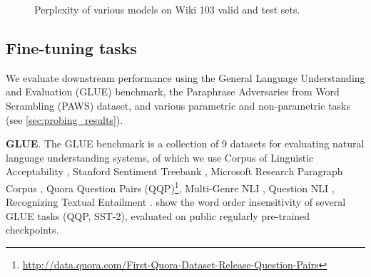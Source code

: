 \documentclass[letterpaper, 12pt]{report}
\newcommand{\xhdr}[1]{{\noindent\bfseries #1}.}
\begin{document}
\begin{figure}[t]
    \centering
    \caption{Perplexity of various models on Wiki 103 valid and test sets.}
    \label{fig:mlm_perplexity}
\end{figure}


\subsection{Fine-tuning tasks}

We evaluate downstream performance using the General Language Understanding and Evaluation (GLUE) benchmark, the Paraphrase Adversaries from Word Scrambling (PAWS) dataset, and various parametric and non-parametric tasks (see \autoref{sec:probing_results}).

\xhdr{GLUE} %
The GLUE \cite{wang-etal-2018-glue} benchmark is a collection of 9 datasets for evaluating natural language understanding systems, of which we use Corpus of Linguistic Acceptability \cite[CoLA,][]{cola_warstadt2019neural}, Stanford Sentiment Treebank \cite[SST,][]{sst2_socher2013recursive}, Microsoft Research Paragraph Corpus \cite[MRPC,][]{mrpc_dolan2005automatically}, Quora Question Pairs (QQP)\footnote{\href{http://data.quora.com/First-Quora-Dataset-Release-Question-Pairs}{http://data.quora.com/First-Quora-Dataset-Release-Question-Pairs}}, Multi-Genre NLI \cite[MNLI,][]{williams-etal-2018-broad}, Question NLI \cite[QNLI,][]{rajpurkar-etal-2016-squad, qnli_2_demszky2018transforming}, Recognizing Textual Entailment \cite[RTE,][]{rte1_dagan2005pascal, rte2_haim2006second, rte3_giampiccolo2007third, rte5_bentivogli2009fifth}.
\citet{pham2020} show the word order insensitivity of several GLUE tasks (QQP, SST-2), evaluated on public regularly pre-trained checkpoints.
\end{document}
